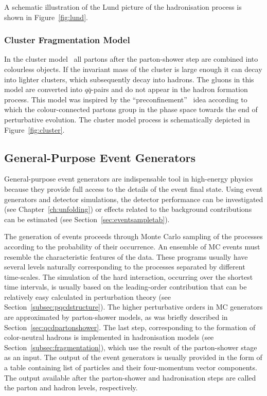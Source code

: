 A schematic illustration of the Lund picture of the hadronisation process is shown in Figure~\ref{fig:lund}.
\subsubsection{Cluster Fragmentation Model}
In the cluster model~\cite{Webber:1983if,Field:1982dg} all partons after the parton-shower step are combined into colourless objects. If the invariant mass of the cluster is large enough it can decay into lighter clusters, which subsequently decay into hadrons. The gluons in this model are converted into $q\bar{q}$-pairs and do not appear in the hadron formation process. This model was inspired by the ``preconfinement''~\cite{Amati:1979fg} idea according to which the colour-connected partons group in the phase space towards the end of perturbative evolution. The cluster model process is schematically depicted in Figure~\ref{fig:cluster}.

\subsection{General-Purpose Event Generators}
General-purpose event generators are indispensable tool in high-energy physics because they provide full access to the details of the event  final state. Using event generators and detector simulations, the detector performance can be investigated (see Chapter~\ref{ch:unfolding}) or effects related to the background contributions can be estimated (see Section~\ref{sec:eventsampletab}).

The generation of events proceeds through Monte Carlo sampling of the processes according to the probability of their occurrence. An ensemble of MC events must resemble the characteristic features of the data. These programs usually have several levels naturally corresponding to the processes separated by different time-scales. The simulation of the hard interaction, occurring over the shortest time intervals, is usually based on the leading-order contribution that can be relatively easy calculated in perturbation theory (see Section~\ref{subsec:pqcdstructure}). The higher perturbative orders in MC generators are approximated by parton-shower models, as was briefly described in Section~\ref{sec:qcdpartonshower}. The last step, corresponding to the formation of color-neutral hadrons is implemented in hadronisation models (see Section~\ref{subsec:fragmentation}), which use the result of the parton-shower stage as an input. The output of the event generators is usually provided in the form of a table containing list of particles and their four-momentum vector components. The output available after the parton-shower and hadronisation steps are called the parton and hadron levels, respectively. 

